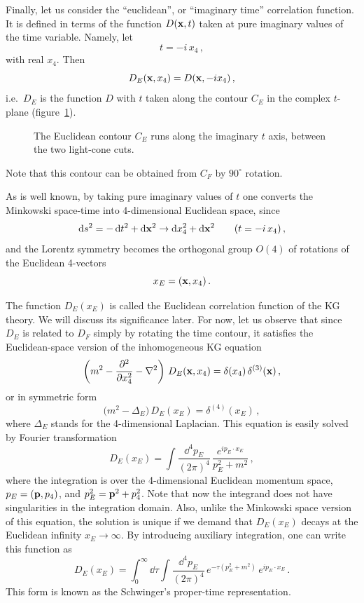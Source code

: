 Finally, let us consider the ``euclidean'', or ``imaginary time'' correlation
function. It is defined in terms of the function $D(\mathbf{x},t)$ taken at pure
imaginary values of the time variable. Namely, let
\[
t=-i\,x_4\,,
\]
with real $x_4$. Then
\[
D_E(\mathbf{x},x_4)=D(\mathbf{x},-ix_4)\,,
\]
i.e.\ $D_E$ is the function $D$ with $t$ taken along the contour $C_E$ in the
complex $t$-plane (figure~\ref{fig:tE}).
\begin{figure}[ht]
\centering{}
\caption{The Euclidean contour $C_E$ runs along the imaginary $t$ axis,
between the two light-cone cuts.}
\label{fig:tE}
\end{figure}
Note that this contour can be obtained from $C_F$ by $90^\circ$ rotation.

As is well known, by taking pure imaginary values of $t$ one converts the
Minkowski space-time into 4-dimensional Euclidean space, since
\[
\mathop{}\!\mathrm{d} s^2=-\mathop{}\!\mathrm{d} t^2+\mathop{}\!\mathrm{d}\mathbf{x}^2\to \mathop{}\!\mathrm{d} x_4^2+\mathop{}\!\mathrm{d}\mathbf{x}^2\qquad(t=-i\,x_4)\,,
\]
and the Lorentz symmetry becomes the orthogonal group $O(4)$ of rotations of
the Euclidean 4-vectors
\[
x_E=(\mathbf{x},x_4)\,.
\]

The function $D_E(x_E)$ is called the Euclidean correlation function of the KG
theory. We will discuss its significance later. For now, let us observe that
since $D_E$ is related to $D_F$ simply by rotating the time contour, it
satisfies the Euclidean-space version of the inhomogeneous KG equation
\[
\left(m^2-\frac{\partial^2}{\partial x_4^2}-\nabla^2\right)\,D_E(\mathbf{x},x_4)=\delta(x_4)\,\delta^{(3)}(\mathbf{x})\,,
\]
or in symmetric form
\[
\bigl(m^2-\Delta_E\bigr)\,D_E(x_E)=\delta^{(4)}(x_E)\,,
\]
where $\Delta_E$ stands for the 4-dimensional Laplacian. This equation is
easily solved by Fourier transformation
\[
D_E(x_E)=\int\frac{\dd^4p_E}{(2\pi)^4}\,\frac{e^{ip_E\cdot x_E}}{p_E^2+m^2}\,,
\]
where the integration is over the 4-dimensional Euclidean momentum space,
$p_E=(\mathbf{p},p_4)$, and $p_E^2=\mathbf{p}^2+p_4^2$. Note that now the integrand does not
have singularities in the integration domain. Also, unlike the Minkowski space
version of this equation, the solution is unique if we demand that $D_E(x_E)$
decays at the Euclidean infinity $x_E\to\infty$. By introducing auxiliary
integration, one can write this function as
\begin{equation}\label{eq:Schwinger}
D_E(x_E)=\int_0^\infty \dd\tau\int\frac{\dd^4p_E}{(2\pi)^4}\,e^{-\tau(p_E^2+m^2)}\,e^{ip_E\cdot x_E}\,.
\end{equation}
This form is known as the Schwinger's proper-time representation.

